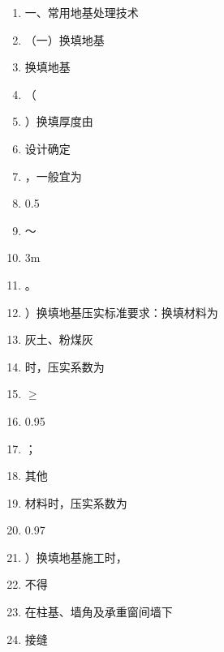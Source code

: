 \documentclass[UTF8,fontset=fandol,11pt]{ctexart}
\begin{document}
\begin{enumerate}[label=\arabic*.]

\item 一、常用地基处理技术

\item （一）换填地基

\item 换填地基

\item （

\item ）换填厚度由

\item 设计确定

\item ，一般宜为

\item 0.5

\item ～

\item 3m

\item 。

\item ）换填地基压实标准要求：换填材料为

\item 灰土、粉煤灰

\item 时，压实系数为

\item $\geq$

\item 0.95

\item ；

\item 其他

\item 材料时，压实系数为

\item 0.97

\item ）换填地基施工时，

\item 不得

\item 在柱基、墙角及承重窗间墙下

\item 接缝

\end{enumerate}

\newpage
\end{document}
